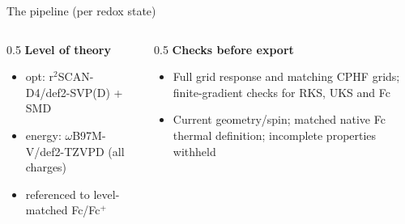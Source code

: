 \begin{frame}{The pipeline (per redox state)}
  \begin{center}
  \end{center}
  \vspace{1ex}
  \begin{columns}[T]
    \begin{column}{0.5\textwidth}
      \footnotesize
      \textbf{Level of theory}
      \begin{itemize}\footnotesize
        \item opt: r$^2$SCAN-D4/def2-SVP(D) + SMD
        \item energy: $\omega$B97M-V/def2-TZVPD (all charges)
        \item referenced to level-matched Fc/Fc$^+$
      \end{itemize}
    \end{column}
    \begin{column}{0.5\textwidth}
      \footnotesize
      \textbf{Checks before export}
      \begin{itemize}\footnotesize
        \item Full grid response and matching CPHF grids;
              finite-gradient checks for RKS, UKS and Fc
        \item Current geometry/spin; matched native Fc thermal definition;
              incomplete properties withheld
      \end{itemize}
    \end{column}
  \end{columns}
\end{frame}

